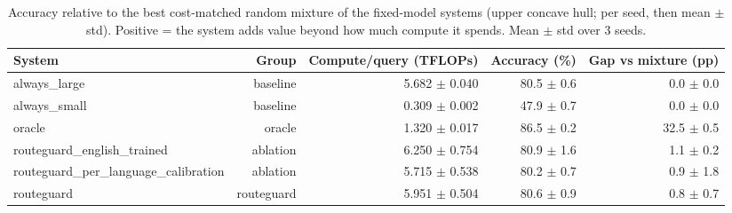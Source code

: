 \begin{table}[t]
\centering
\small
\caption{Accuracy relative to the best cost-matched random mixture of the fixed-model systems (upper concave hull; per seed, then mean $\pm$ std). Positive = the system adds value beyond how much compute it spends. Mean $\pm$ std over 3 seeds.}
\label{tab:cost_matched_mixture}
\begin{tabular}{lrrrr}
\toprule
System & Group & Compute/query (TFLOPs) & Accuracy (\%) & Gap vs mixture (pp) \\
\midrule
always\_large & baseline & 5.682 $\pm$ 0.040 & 80.5 $\pm$ 0.6 & 0.0 $\pm$ 0.0 \\
always\_small & baseline & 0.309 $\pm$ 0.002 & 47.9 $\pm$ 0.7 & 0.0 $\pm$ 0.0 \\
oracle & oracle & 1.320 $\pm$ 0.017 & 86.5 $\pm$ 0.2 & 32.5 $\pm$ 0.5 \\
routeguard\_english\_trained & ablation & 6.250 $\pm$ 0.754 & 80.9 $\pm$ 1.6 & 1.1 $\pm$ 0.2 \\
routeguard\_per\_language\_calibration & ablation & 5.715 $\pm$ 0.538 & 80.2 $\pm$ 0.7 & 0.9 $\pm$ 1.8 \\
routeguard & routeguard & 5.951 $\pm$ 0.504 & 80.6 $\pm$ 0.9 & 0.8 $\pm$ 0.7 \\
\bottomrule
\end{tabular}
\end{table}
